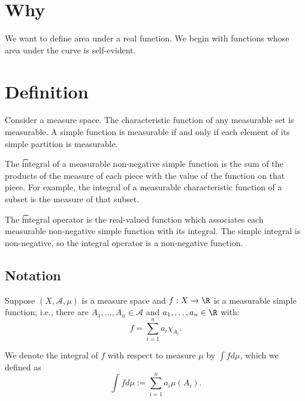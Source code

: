 
\section*{Why}

We want to define area under a real function.
We begin with functions whose area under the curve is self-evident.

\section*{Definition}

Consider a measure space.
The characteristic function of any measurable set is measurable.
A simple function is measurable if and only if each element of its simple partition is measurable.

The \t{integral} of a measurable non-negative simple function is the sum of the products of the measure of each piece with the value of the function on that piece.
For example, the integral of a measurable characteristic function of a subset is the measure of that subset.

The \t{integral operator} is the real-valued function which associates each measurable non-negative simple function with its integral.
The simple integral is non-negative, so the integral operator is a non-negative function.

\subsection*{Notation}


Suppose $(X, \mathcal{A} , \mu )$ is a measure space and $f: X \to \R $ is a measurable simple function; i.e., there are $A_1, \dots , A_n \in \mathcal{A} $ and $a_1, \dots , a_n \in \R $ with:
\[
f = \sum_{i = 1}^{n} a_i \chi _{A_i}.
\]

We denote the integral of $f$ with respect to measure $\mu $ by $\int  f d\mu $, which we defined as
\[
\int  f d\mu  := \sum_{i = 1}^{n} a_i \mu (A_i).
\]
